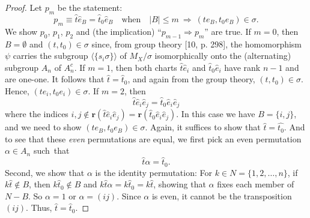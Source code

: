 \documentclass{surv-l}
\numberwithin{equation}{section}
\numberwithin{table}{section}
\numberwithin{figure}{section}
\theoremstyle{definition}
\begin{document}
\begin{proof} Let $p_{m}$ be the statement:
\[
p_{m} \equiv\widehat{t}\widehat{e}_{B}=\widehat{t}_{0}\widehat{e}_{B}\quad
\mathrm{when}\quad |B|\leq m\ \Rightarrow\ (te_{B}, t_{0}e_{B})\in\sigma.
\]
We show $p_{0}$, $p_{1}$, $p_{2}$ and (the implication)
``$p_{m-1}\Rightarrow p_{m}$'' are true. If $m= 0$, then
$B=\emptyset$ and $(t,t_{0})\in\sigma$ since, from group theory
[10, p. 298], the homomorphism $\psi$ carries the
subgroup $\langle\{s_{i}\sigma\}\rangle$ of $M_{X}/\sigma$
isomorphically onto the (alternating) subgroup $A_{n}$ of
$A_{n}^{c}$. If $m=1$, then both charts
$\widehat{t}\widehat{e}_{i}$ and $\widehat{t}_{0}\widehat{e}_{i}$
have rank $n-1$ and are one-one. It follows that
$\widehat{t}=\widehat{t}_{0}$, and again from the group theory,
$(t, t_{0})\in\sigma$. Hence, $(te_{i}, t_{0}e_{i})\in\sigma$. If
$m=2$, then
\[
\widehat{t}\widehat{e}_{i}\widehat{e}_{j}=\widehat{t}_{0}\widehat{e}_{i}\widehat{e}_{j}
\]
where the indices $i,j\not\in
\mathbf{r}(\widehat{t}\widehat{e}_{i}\widehat{e}_{j})=\mathbf{r}(\widehat{t}_{0}\widehat{e}_{i}\widehat{e}_{j})$.
In this case we have $B=\{i,j\}$, and we need to show $(te_{B},
t_{0}e_{B})\in\sigma$. Again, it suffices to show that
$\widehat{t}=\widehat{t_{0}}$. And to see that these \emph{even}
permutations are equal, we first pick an even permutation
$\alpha\in A_{n}$ such~that
\[
\widehat{t}\alpha=\widehat{t}_{0}.
\]
Second, we show that $\alpha$ is the identity permutation: For
$k\in N=\{1,2,\ldots, n\}$, if $k\widehat{t}\not\in B$, then
$k\widehat{t}_{0}\not\in B$ and
$k\widehat{t}\alpha=k\widehat{t}_{0}=k\widehat{t}$, showing that
$\alpha$ fixes each member of $N-B$. So $\alpha=1$ or
$\alpha=(ij)$. Since $\alpha$ is even, it cannot be the
transposition $(ij)$. Thus, $\widehat{t}=\widehat{t}_{0}$.


\end{proof}
\end{document}
